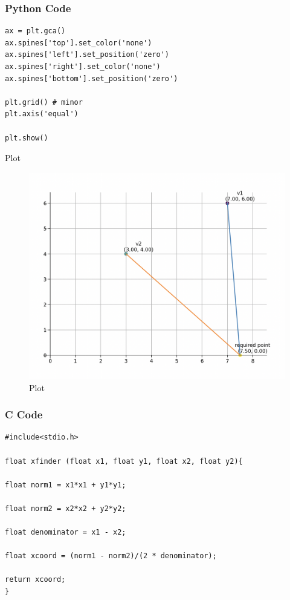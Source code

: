 \documentclass{beamer}
\begin{document}
\begin{frame}[fragile]
    \frametitle{Python Code}

    \begin{lstlisting}
ax = plt.gca()
ax.spines['top'].set_color('none')
ax.spines['left'].set_position('zero')
ax.spines['right'].set_color('none')
ax.spines['bottom'].set_position('zero')

plt.grid() # minor
plt.axis('equal')

plt.show()
    \end{lstlisting}
\end{frame}


\begin{frame}{Plot}
\begin{figure}
    \centering
    \includegraphics[width=0.8\columnwidth]{Figs/Figure_2.png}
    \caption{Plot}
    \label{fig:placeholder}
\end{figure}
\end{frame}

\begin{frame}[fragile]
\frametitle{C Code}
\begin{lstlisting}
#include<stdio.h>

float xfinder (float x1, float y1, float x2, float y2){

float norm1 = x1*x1 + y1*y1;

float norm2 = x2*x2 + y2*y2;

float denominator = x1 - x2;

float xcoord = (norm1 - norm2)/(2 * denominator);

return xcoord;
}




\end{lstlisting}

\end{frame}
\end{document}
